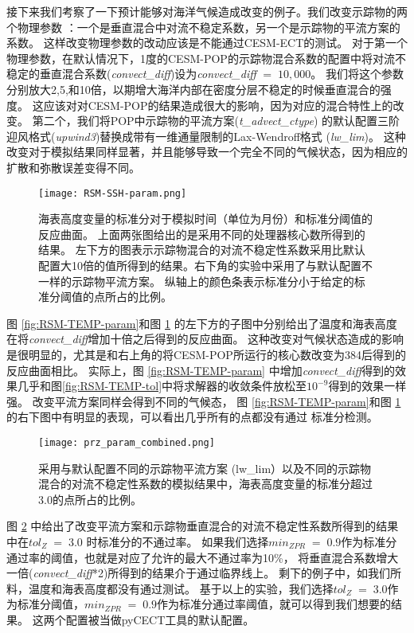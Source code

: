接下来我们考察了一下预计能够对海洋气候造成改变的例子。我们改变示踪物的两个物理参数 ：一个是垂直混合中对流不稳定系数，另一个是示踪物的平流方案的系数。
这样改变物理参数的改动应该是不能通过CESM-ECT的测试。
对于第一个物理参数，在默认情况下，1度的CESM-POP的示踪物混合系数的配置中将对流不稳定的垂直混合系数(\textit{convect\_diff})设为\textit{convect\_diff} $=\; 10,000$。
我们将这个参数分别放大2,5,和10倍，以期增大海洋内部在密度分层不稳定的时候垂直混合的强度。
这应该对对CESM-POP的结果造成很大的影响，因为对应的混合特性上的改变。
第二个，我们将POP中示踪物的平流方案(\textit{t\_advect\_ctype}) 的默认配置三阶迎风格式(\textit{upwind3})替换成带有一维通量限制的Lax-Wendroff格式 (\textit{lw\_lim})。
这种改变对于模拟结果同样显著，并且能够导致一个完全不同的气候状态，因为相应的扩散和弥散误差变得不同。

\begin{figure} [!ht]
\centering
\texttt{[image: RSM-SSH-param.png]}
\caption {
海表高度变量的标准分对于模拟时间（单位为月份）和标准分阈值的反应曲面。
上面两张图给出的是采用不同的处理器核心数所得到的结果。
左下方的图表示示踪物混合的对流不稳定性系数采用比默认配置大10倍的值所得到的结果。右下角的实验中采用了与默认配置不一样的示踪物平流方案。
纵轴上的颜色条表示标准分小于给定的标准分阈值的点所占的比例。}
\label{fig:RSM-SSH-param}
\end {figure}
 
图 \ref{fig:RSM-TEMP-param}和图 \ref{fig:RSM-SSH-param} 的左下方的子图中分别给出了温度和海表高度在将\textit{convect\_diff}增加十倍之后得到的反应曲面。 这种改变对气候状态造成的影响是很明显的，尤其是和右上角的将CESM-POP所运行的核心数改变为384后得到的反应曲面相比。
实际上，图  \ref{fig:RSM-TEMP-param} 中增加\textit{convect\_diff}得到的效果几乎和图\ref{fig:RSM-TEMP-tol}中将求解器的收敛条件放松至$10^{-9}$得到的效果一样强。
改变平流方案同样会得到不同的气候态， 图 \ref{fig:RSM-TEMP-param}和图 \ref{fig:RSM-SSH-param} 的右下图中有明显的表现，可以看出几乎所有的点都没有通过 标准分检测。 


\begin{figure} 
\centering
\texttt{[image: prz\_param\_combined.png]}
\caption{ 
  采用与默认配置不同的示踪物平流方案 (lw\_lim）以及不同的示踪物混合的对流不稳定性系数的模拟结果中，海表高度变量的标准分超过3.0的点所占的比例。}
\label {fig:PRZ-temp-param}
\end{figure}

   
图 \ref{fig:PRZ-temp-param} 中给出了改变平流方案和示踪物垂直混合的对流不稳定性系数所得到的结果中在$tol_{Z} \; = \; 3.0$ 时标准分的不通过率。
如果我们选择$min_{ZPR} \; = \; 0.9$作为标准分通过率的阈值，也就是对应了允许的最大不通过率为10\%， 将垂直混合系数增大一倍(\textit{convect\_diff}*2)所得到的结果介于通过临界线上。
剩下的例子中，如我们所料，温度和海表高度都没有通过测试。 
基于以上的实验，我们选择$tol_{Z} \; = \; 3.0$作为标准分阈值，$min_{ZPR} \; = \; 0.9$作为标准分通过率阈值，就可以得到我们想要的结果。
这两个配置被当做pyCECT工具的默认配置。 


